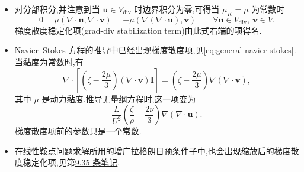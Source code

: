 \begin{note}[梯度散度项]\label{note:stokes-grad-div-term}
\begin{itemize}
  \item 对分部积分,并注意到当 $\bm{u}\in V_{\mathrm{div}}$ 时边界积分为零,可得当 $\mu_K=\mu$ 为常数时
  \[
   0=\mu(\nabla\cdot\bm{u},\nabla\cdot\bm{v})
    =-\mu(\nabla(\nabla\cdot\bm{u}),\bm{v})
    \qquad\forall\bm{u}\in V_{\mathrm{div}},\ \bm{v}\in V.
  \]
  梯度散度稳定化项(grad-div stabilization term)由此式右端的项得名.
  \item Navier--Stokes 方程的推导中已经出现梯度散度项,见\cref{eq:general-navier-stokes}.当黏度为常数时,有
  \[
   \nabla\cdot\left[
     \left(\zeta-\frac{2\mu}{3}\right)
       (\nabla\cdot\bm{v})\bm{I}\right]
   =\left(\zeta-\frac{2\mu}{3}\right)
       \nabla(\nabla\cdot\bm{v}),
  \]
  其中 $\mu$ 是动力黏度.推导无量纲方程时,这一项变为
  \[
   \frac{L}{U^2}
   \left(\frac{\zeta}{\rho}-\frac{2\nu}{3}\right)
   \nabla(\nabla\cdot\bm{u}).
  \]
  梯度散度项前的参数只是一个常数.
  \item 在线性鞍点问题求解所用的增广拉格朗日预条件子中,也会出现缩放后的梯度散度稳定化项,见第\hyperref[note:linear-saddle-point-augmented-lagrangian-preconditioner]{9.35 条笔记}.
\end{itemize}
\end{note}

